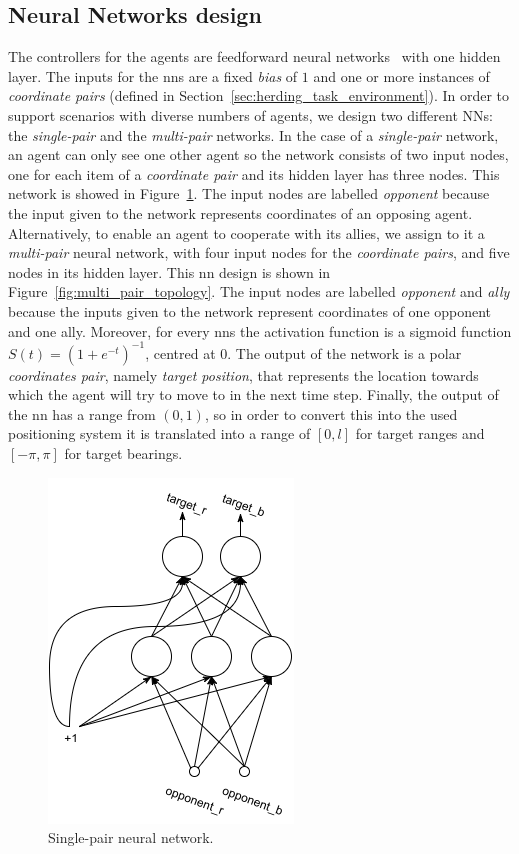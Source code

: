 \documentclass[conference]{IEEEtran}
\begin{document}
\subsection{Neural Networks design}
\label{sec:NN_design}
The controllers for the agents are feedforward neural networks~\cite{bebis1994feed} with one hidden layer.
The inputs for the \glspl{nn} are a fixed \textit{bias} of $1$ and one or more instances of \textit{coordinate pairs} (defined in Section~\ref{sec:herding_task_environment}).
In order to support scenarios with diverse numbers of agents, we design two different NNs: the \textit{single-pair} and the \textit{multi-pair} networks. 
In the case of a \textit{single-pair} network, an agent can only see one other agent so the network consists of two input nodes, one for each item of a \textit{coordinate pair} and its hidden layer has three nodes. 
This network is showed in Figure~\ref{fig:single_pair_topology}.
The input nodes are labelled \textit{opponent} because the input given to the network represents coordinates of an opposing agent.
Alternatively, to enable an agent to cooperate with its allies, we assign to it a \textit{multi-pair} neural network, with four input nodes for the \textit{coordinate pairs}, and five nodes in its hidden layer.
This \gls{nn} design is shown in Figure~\ref{fig:multi_pair_topology}.
The input nodes are labelled \textit{opponent} and \textit{ally} because the inputs given to the network represent coordinates of one opponent and one ally.
Moreover, for every \glspl{nn} the activation function is a sigmoid function $S(t) = (1 + e^{-t})^{-1}$, centred at $0$. 
The output of the network is a polar \textit{coordinates pair}, namely \textit{target position}, that represents the
location towards which the agent will try to move to in the next time step.
Finally, the output of the \gls{nn} has a range from $(0, 1)$, so in order to convert this into the used positioning system it is translated into a range of $[0, l]$ for target ranges and $[-\pi, \pi]$ for target bearings. 
 
\begin{figure}[t]
	\centering
	\includegraphics[width=0.5\hsize]{imgs/nn-design_single.png}
	\caption{Single-pair neural network.}
	\label{fig:single_pair_topology}
\end{figure}
\end{document}
